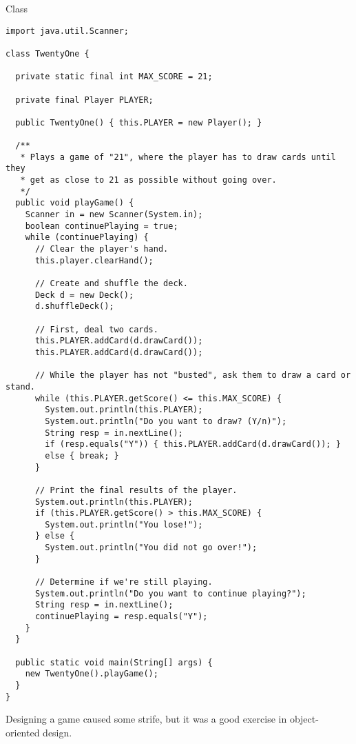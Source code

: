 \begin{cl}{ Class}
\begin{lstlisting}[language=MyJava]
import java.util.Scanner;

class TwentyOne {

  private static final int MAX_SCORE = 21;

  private final Player PLAYER;

  public TwentyOne() { this.PLAYER = new Player(); }

  /**
   * Plays a game of "21", where the player has to draw cards until they
   * get as close to 21 as possible without going over.
   */
  public void playGame() {
    Scanner in = new Scanner(System.in);
    boolean continuePlaying = true;
    while (continuePlaying) {
      // Clear the player's hand.
      this.player.clearHand();

      // Create and shuffle the deck.
      Deck d = new Deck();
      d.shuffleDeck();

      // First, deal two cards.
      this.PLAYER.addCard(d.drawCard());
      this.PLAYER.addCard(d.drawCard());

      // While the player has not "busted", ask them to draw a card or stand.
      while (this.PLAYER.getScore() <= this.MAX_SCORE) {
        System.out.println(this.PLAYER);
        System.out.println("Do you want to draw? (Y/n)");
        String resp = in.nextLine();
        if (resp.equals("Y")) { this.PLAYER.addCard(d.drawCard()); }
        else { break; }
      }

      // Print the final results of the player.
      System.out.println(this.PLAYER);
      if (this.PLAYER.getScore() > this.MAX_SCORE) {
        System.out.println("You lose!");
      } else {
        System.out.println("You did not go over!");
      }

      // Determine if we're still playing.
      System.out.println("Do you want to continue playing?");
      String resp = in.nextLine();
      continuePlaying = resp.equals("Y");
    }
  }

  public static void main(String[] args) {
    new TwentyOne().playGame();
  }
}
\end{lstlisting}
\end{cl}

Designing a game caused some strife, but it was a good exercise in object-oriented design.


